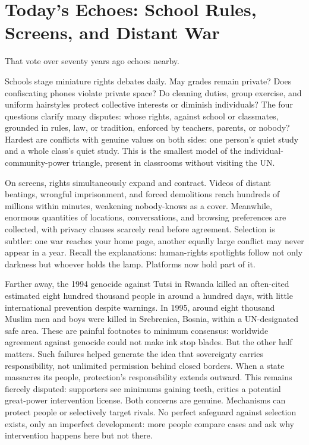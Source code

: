 \section[School Rules, Screens, and Distant War]{Today's Echoes: School Rules, Screens, and Distant War}
That vote over seventy years ago echoes nearby.

Schools stage miniature rights debates daily. May grades remain private? Does confiscating phones violate private space? Do cleaning duties, group exercise, and uniform hairstyles protect collective interests or diminish individuals? The four questions clarify many disputes: whose rights, against school or classmates, grounded in rules, law, or tradition, enforced by teachers, parents, or nobody? Hardest are conflicts with genuine values on both sides: one person's quiet study and a whole class's quiet study. This is the smallest model of the individual-community-power triangle, present in classrooms without visiting the UN.

On screens, rights simultaneously expand and contract. Videos of distant beatings, wrongful imprisonment, and forced demolitions reach hundreds of millions within minutes, weakening nobody-knows as a cover. Meanwhile, enormous quantities of locations, conversations, and browsing preferences are collected, with privacy clauses scarcely read before agreement. Selection is subtler: one war reaches your home page, another equally large conflict may never appear in a year. Recall the explanations: human-rights spotlights follow not only darkness but whoever holds the lamp. Platforms now hold part of it.

Farther away, the 1994 genocide against Tutsi in Rwanda killed an often-cited estimated eight hundred thousand people in around a hundred days, with little international prevention despite warnings. In 1995, around eight thousand Muslim men and boys were killed in Srebrenica, Bosnia, within a UN-designated safe area. These are painful footnotes to minimum consensus: worldwide agreement against genocide could not make ink stop blades. But the other half matters. Such failures helped generate the idea that sovereignty carries responsibility, not unlimited permission behind closed borders. When a state massacres its people, protection's responsibility extends outward. This remains fiercely disputed: supporters see minimums gaining teeth, critics a potential great-power intervention license. Both concerns are genuine. Mechanisms can protect people or selectively target rivals. No perfect safeguard against selection exists, only an imperfect development: more people compare cases and ask why intervention happens here but not there.

